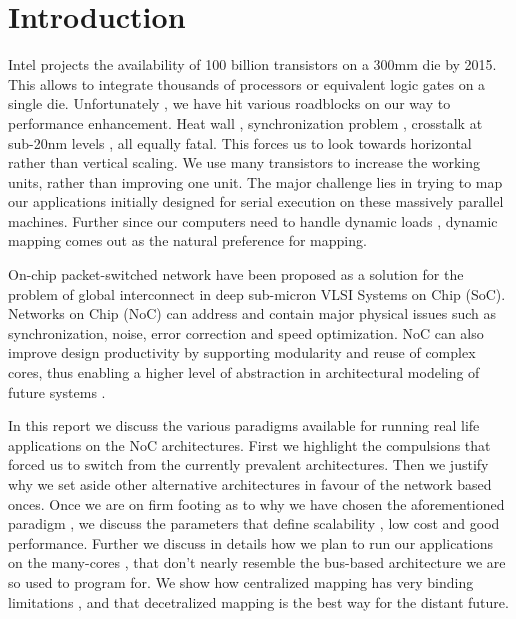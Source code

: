 
\chapter*{Introduction}


Intel projects the availability of 100 billion transistors on a 300mm
die by 2015. This allows to integrate thousands of processors or equivalent
logic gates on a single die. Unfortunately , we have hit various roadblocks
on our way to performance enhancement. Heat wall , synchronization
problem , crosstalk at sub-20nm levels , all equally fatal. This forces
us to look towards horizontal rather than vertical scaling. We use
many transistors to increase the working units, rather than improving
one unit. The major challenge lies in trying to map our applications
initially designed for serial execution on these massively parallel
machines. Further since our computers need to handle dynamic loads
, dynamic mapping comes out as the natural preference for mapping.

On-chip packet-switched network have been proposed as a solution for
the problem of global interconnect in deep sub-micron VLSI Systems
on Chip (SoC). Networks on Chip (NoC) can address and contain major
physical issues such as synchronization, noise, error correction and
speed optimization. NoC can also improve design productivity by supporting
modularity and reuse of complex cores, thus enabling a higher level
of abstraction in architectural modeling of future systems .

In this report we discuss the various paradigms available for running
real life applications on the NoC architectures. First we highlight
the compulsions that forced us to switch from the currently prevalent
architectures. Then we justify why we set aside other alternative
architectures in favour of the network based onces. Once we are on
firm footing as to why we have chosen the aforementioned paradigm
, we discuss the parameters that define scalability ,  low cost and
good performance. Further we discuss in details how we plan to run
our applications on the many-cores , that don't nearly resemble the
bus-based architecture we are so used to program for. We show how
centralized mapping has very binding limitations , and that decetralized
mapping is the best way for the distant future. 
